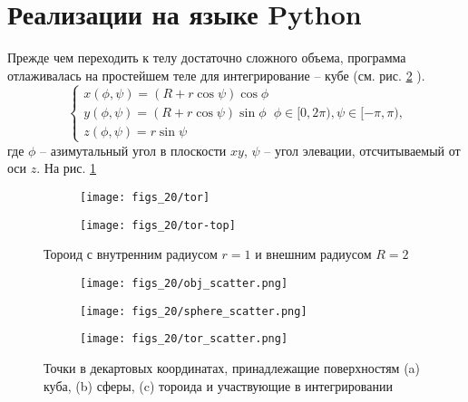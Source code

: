 

\section{Реализации на языке Python}

Прежде чем переходить к телу достаточно сложного объема, программа отлаживалась
на простейшем теле для интегрирование -- кубе (см. рис. \ref{fig:scatter} ).
\begin{equation}
    \label{eq:tor}
    \begin{cases}
        x(\phi, \psi) = (R + r\cos \psi) \cos \phi \\
        y(\phi, \psi) = (R + r\cos \psi) \sin \phi \\
        z(\phi, \psi) = r\sin \psi
    \end{cases}
    \phi \in [0, 2\pi), \psi \in [-\pi, \pi),
\end{equation}
где $\phi$ -- азимутальный угол в плоскости  $xy$,  $\psi$ -- угол элевации,
отсчитываемый от оси $z$. На рис. \ref{fig:tor}
\begin{figure}[h]
    \centering
    \begin{subfigure}{0.49\linewidth}
        \centering
        \texttt{[image: figs\_20/tor]}
    \end{subfigure}
    \begin{subfigure}{0.49\linewidth}
        \centering
        \texttt{[image: figs\_20/tor-top]}
    \end{subfigure}
    \caption{Тороид с внутренним радиусом $r=1$  и внешним радиусом  $R=2$}
    \label{fig:tor}
\end{figure}

\begin{figure}[h]
    \centering
    \begin{subfigure}{0.49\linewidth}
        \centering
        \texttt{[image: figs\_20/obj\_scatter.png]}
        \caption{}
    \end{subfigure}
    \begin{subfigure}{0.49\linewidth}
        \centering
        \texttt{[image: figs\_20/sphere\_scatter.png]}
        \caption{}
    \end{subfigure}
    \begin{subfigure}{0.49\linewidth}
        \centering
        \texttt{[image: figs\_20/tor\_scatter.png]}
        \caption{}
    \end{subfigure}
    \label{fig:scatter}
    \caption{Точки в декартовых координатах, принадлежащие поверхностям
    (a) куба, (b) сферы, (c) тороида и участвующие в интегрировании}
\end{figure}





